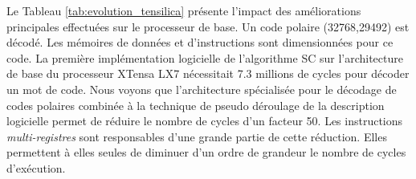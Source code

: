 Le Tableau \ref{tab:evolution_tensilica} présente l'impact des améliorations principales effectuées sur le processeur de base. Un code polaire (32768,29492) est décodé. Les mémoires de données et d'instructions sont dimensionnées pour ce code. La première implémentation logicielle de l'algorithme SC sur l'architecture de base du processeur XTensa LX7 nécessitait 7.3 millions de cycles pour décoder un mot de code. Nous voyons que l'architecture spécialisée pour le décodage de codes polaires combinée à la technique de pseudo déroulage de la description logicielle permet de réduire le nombre de cycles d'un facteur 50. Les instructions \textit{multi-registres} sont responsables d'une grande partie de cette réduction. Elles permettent à elles seules de diminuer d'un ordre de grandeur le nombre de cycles d'exécution.
 \begin{table}[htp]
    \renewcommand{\arraystretch}{1.1}
    \centering
    \caption{Impact de chaque amélioration de l'ASIP sur le nombre de cycles d'horloges nécessaires pour décoder une trame, le débit et la surface occupée. La taille des mémoires n'est pas prise en compte pour la surface occupée. Décodage d'un code polaire (32768,29492). Fréquence considérée : 835 MHz.}
    \label{tab:evolution_tensilica}
    {\small{}}
  \end{table}


